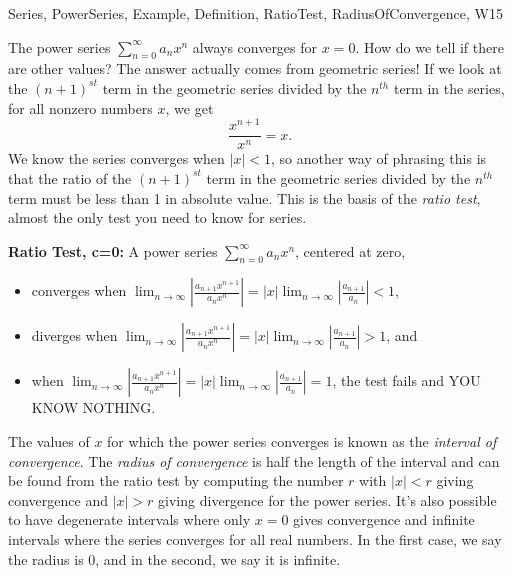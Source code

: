 \begin{tagblock}{Series, PowerSeries, Example, Definition, RatioTest, RadiusOfConvergence, W15}
\begin{question}

The power series $\displaystyle\sum_{n=0}^{\infty}a_nx^n$ always converges for $x=0$. How do we tell if there are other values? The answer actually comes from geometric series! If we look at the $(n+1)^{st}$ term in the geometric series divided by the $n^{th}$ term in the series, for all nonzero numbers $x$, we get 
\[
\frac{x^{n+1}}{x^n}=x.
\]
We know the series converges when $|x|<1$, so another way of phrasing this is that the ratio of the $(n+1)^{st}$ term in the geometric series divided by the $n^{th}$ term must be less than 1 in absolute value. This is the basis of the \textit{ratio test}, almost the only test you need to know for series.

\bigskip

\noindent\textbf{Ratio Test, c=0:} A power series $\displaystyle\sum_{n=0}^{\infty}a_nx^n$, centered at zero,
\begin{itemize}
\item converges when $\displaystyle\lim_{n\to\infty}\left|\frac{a_{n+1}x^{n+1}}{a_nx^n}\right|=|x|\lim_{n\to\infty}\left|\frac{a_{n+1}}{a_n}\right|<1$,
\item diverges when $\displaystyle\lim_{n\to\infty}\left|\frac{a_{n+1}x^{n+1}}{a_nx^n}\right|=|x|\lim_{n\to\infty}\left|\frac{a_{n+1}}{a_n}\right|>1$, and 

\item when $\displaystyle\lim_{n\to\infty}\left|\frac{a_{n+1}x^{n+1}}{a_nx^n}\right|=|x|\lim_{n\to\infty}\left|\frac{a_{n+1}}{a_n}\right|=1$, the test fails and YOU KNOW NOTHING. 
\end{itemize}
\bigskip

The values of $x$ for which the power series converges is known as the \textit{interval of convergence}. The \textit{radius of convergence} is half the length of the interval and can be found from the ratio test by computing the number $r$ with $|x|<r$ giving convergence and $|x|>r$ giving divergence for the power series. It's also possible to have degenerate intervals where only $x=0$ gives convergence and infinite intervals where the series converges for all real numbers. In the first case, we say the radius is 0, and in the second, we say it is infinite.

\bigskip


\end{question}
\end{tagblock}
